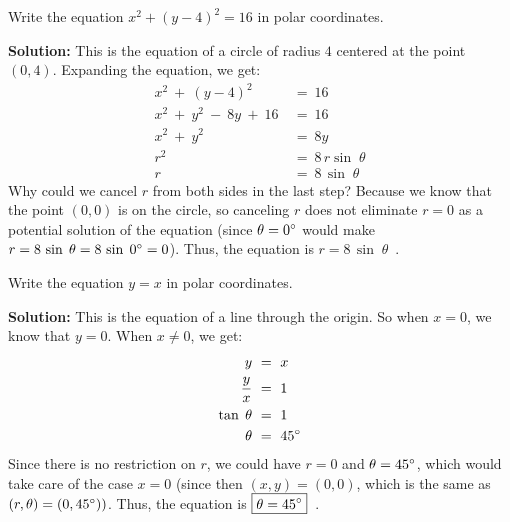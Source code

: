 \begin{exmp}
 Write the equation $x^2 + (y-4)^2 = 16$ in polar coordinates.\vspace{1mm}
 \par\noindent\textbf{Solution:} This is the equation of a circle of radius $4$ centered at the point
 $(0,4)$. Expanding the equation, we get:
 \begin{align*}
  x^2 ~+~ (y-4)^2 ~&=~ 16\\
  x^2 ~+~ y^2 ~-~ 8y ~+~ 16 ~&=~ 16\\
  x^2 ~+~ y^2 ~&=~ 8y\\
  r^2 ~&=~ 8\,r\sin\;\theta\\
  r ~&=~ 8\,\sin\;\theta
 \end{align*}
 Why could we cancel $r$ from both sides in the last step? Because we know that the point $(0,0)$
 is on the circle, so canceling $r$ does not eliminate $r=0$ as a potential solution of the
 equation (since $\theta = 0^\circ$ would make $r = 8\,\sin\;\theta = 8\,\sin\;0^\circ = 0$). Thus,
 the equation is $\boxed{r = 8\,\sin\;\theta}$~.
\end{exmp}
\begin{exmp}
 Write the equation $y = x$ in polar coordinates.\vspace{1mm}
 \par\noindent\textbf{Solution:} This is the equation of a line through the origin. So when $x=0$, we
 know that $y=0$. When $x \ne 0$, we get:
 \begin{align*}
  y ~&=~ x\\
  \frac{y}{x} ~&=~ 1\\
  \tan\;\theta ~&=~ 1\\
  \theta ~&=~ 45^\circ
 \end{align*}
Since there is no restriction on $r$, we could have $r=0$ and $\theta = 45^\circ$, which would take care
of the case $x = 0$ (since then $(x,y) = (0,0)$, which is the same as $(r,\theta) = (0,45^\circ))$. Thus,
the equation is $\boxed{\theta = 45^\circ}$~.
\end{exmp}\vspace{-1mm}
\divider\vspace{-2mm}
\newpage
